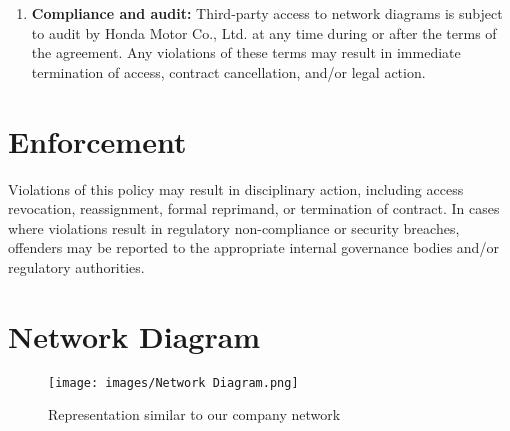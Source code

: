 \begin{enumerate}
    \item \textbf{Compliance and audit:}
    Third-party access to network diagrams is subject to audit by Honda Motor Co., Ltd. at any time during or after the terms of the agreement. Any violations of these terms may result in immediate termination of access, contract cancellation, and/or legal action.
\end{enumerate}
\section{Enforcement}
Violations of this policy may result in disciplinary action, including access revocation, reassignment, formal reprimand, or termination of contract. In cases where violations result in regulatory non-compliance or security breaches, offenders may be reported to the appropriate internal governance bodies and/or regulatory authorities.

\section{Network Diagram}
\begin{figure}[htbp]
    \centering
    \texttt{[image: images/Network Diagram.png]}
    \caption{Representation similar to our company network}
    \label{fig:Diagram 7.23.2025}
\end{figure}
